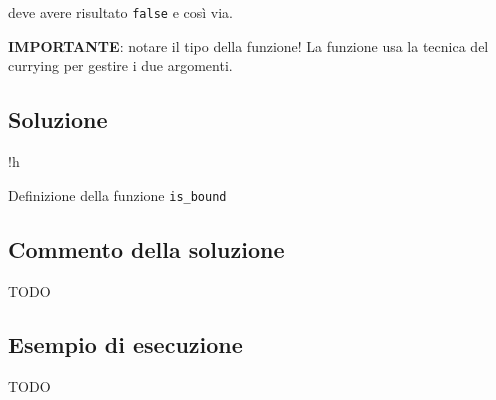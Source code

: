 deve avere risultato \texttt{false} e così via.

\medskip
\textbf{IMPORTANTE}: notare il tipo della funzione! La funzione usa la tecnica del currying per gestire i due argomenti.

\subsection*{Soluzione}

\begin{listing}{!h}
\caption{Definizione della funzione \texttt{is_bound}}
\end{listing}

\subsection{Commento della soluzione}

TODO

\subsection*{Esempio di esecuzione}

TODO
